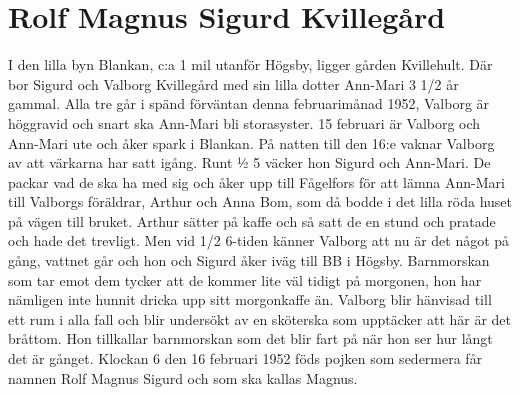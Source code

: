 \chapter{Rolf Magnus Sigurd Kvillegård}
\label{rolfmagnussigurdkvillegård}
I den lilla byn Blankan, c:a 1 mil utanför Högsby, ligger gården Kvillehult. Där bor Sigurd och Valborg Kvillegård med sin lilla dotter Ann-Mari 3 1/2 år gammal. Alla tre går i spänd förväntan denna februarimånad 1952, Valborg är höggravid och snart ska Ann-Mari bli storasyster. 15 februari är Valborg och Ann-Mari ute och åker spark i Blankan. På natten till den 16:e vaknar Valborg av att värkarna har satt igång. Runt ½ 5 väcker hon Sigurd och Ann-Mari. De packar vad de ska ha med sig och åker upp till Fågelfors för att lämna Ann-Mari till Valborgs föräldrar, Arthur och Anna Bom, som då bodde i det lilla röda huset på vägen till bruket. Arthur sätter på kaffe och så satt de en stund och pratade och hade det trevligt. Men vid 1/2 6-tiden känner Valborg att nu är det något på gång, vattnet går och hon och Sigurd åker iväg till BB i Högsby. Barnmorskan som tar emot dem tycker att de kommer lite väl tidigt på morgonen, hon har nämligen inte hunnit dricka upp sitt morgonkaffe än. Valborg blir hänvisad till ett rum i alla fall och blir undersökt av en sköterska som upptäcker att här är det bråttom. Hon tillkallar barnmorskan som det blir fart på när hon ser hur långt det är gånget. Klockan 6 den 16 februari 1952 föds pojken som sedermera får namnen Rolf Magnus Sigurd och som ska kallas Magnus.

